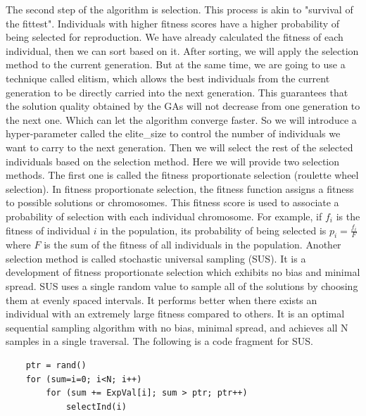 \documentclass[letterpaper, 12 pt, conference]{ieeeconf}  %
\begin{document}
The second step of the algorithm is selection. This process is akin to "survival of the fittest". Individuals with higher fitness scores have a higher probability of being selected for reproduction. We have already calculated the fitness of each individual, then we can sort based on it. After sorting, we will apply the selection method to the current generation. But at the same time, we are going to use a technique called elitism, which allows the best individuals from the current generation to be directly carried into the next generation. This guarantees that the solution quality obtained by the GAs will not decrease from one generation to the next one.\cite{Bs22} Which can let the algorithm converge faster. So we will introduce a hyper-parameter called the elite\_size to control the number of individuals we want to carry to the next generation. Then we will select the rest of the selected individuals based on the selection method. Here we will provide two selection methods. The first one is called the fitness proportionate selection (roulette wheel selection). In fitness proportionate selection, the fitness function assigns a fitness to possible solutions or chromosomes. This fitness score is used to associate a probability of selection with each individual chromosome. For example, if $f_i$ is the fitness of individual $i$ in the population, its probability of being selected is $p_i=\frac{f_i}{F}$ where $F$ is the sum of the fitness of all individuals in the population. \cite{wikifps} Another selection method is called stochastic universal sampling (SUS). It is a development of fitness proportionate selection which exhibits no bias and minimal spread. SUS uses a single random value to sample all of the solutions by choosing them at evenly spaced intervals. It performs better when there exists an individual with an extremely large fitness compared to others. \cite{wikisus} It is an optimal sequential sampling algorithm with no bias, minimal spread, and achieves all N samples in a single traversal. The following is a code fragment for SUS. \cite{Jeb}
\begin{verbatim}
    ptr = rand()
    for (sum=i=0; i<N; i++)
        for (sum += ExpVal[i]; sum > ptr; ptr++)
            selectInd(i)
\end{verbatim}
\end{document}
